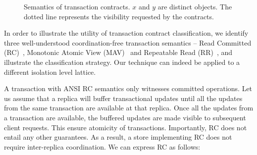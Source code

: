\begin{figure}
\centering
{}
\hfill
{}
\hfill
{}
\caption{Semantics of transaction contracts. $x$ and $y$ are distinct objects.
The dotted line represents the visibility requested by the contracts.}
\label{fig:transaction}
\end{figure}

In order to illustrate the utility of transaction contract classification, we
identify three well-understood coordination-free transaction semantics -- Read
Committed (RC)~\cite{Berenson95}, Monotonic Atomic View (MAV)~\cite{BailisHAT}
and Repeatable Read (RR)~\cite{Berenson95}, and illustrate the classification
strategy. Our technique can indeed be applied to a different isolation level
lattice.

A transaction with ANSI RC semantics only witnesses committed operations. Let
us assume that a replica will buffer transactional updates until all the
updates from the same transaction are available at that replica. Once all the
updates from a transaction are available, the buffered updates are made visible
to subsequent client requests. This ensure atomicity of transactions.
Importantly, RC does not entail any other guarantees. As a result, a store
implementing RC does not require inter-replica coordination. We can express RC
as follows:

